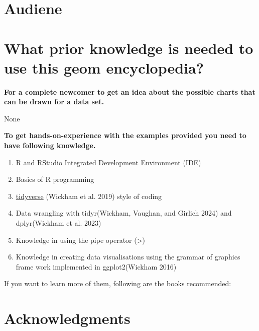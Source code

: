 \documentclass[
  letterpaper,
  DIV=11,
  numbers=noendperiod]{scrreprt}
\begin{document}

\section*{Audiene}\label{audiene}


\section*{\texorpdfstring{What prior knowledge is needed to use this
{geom
encyclopedia}?}{What prior knowledge is needed to use this geom encyclopedia?}}\label{what-prior-knowledge-is-needed-to-use-this-geom-encyclopedia}


\textbf{For a complete newcomer to get an idea about the possible charts
that can be drawn for a data set.}

None

\textbf{To get hands-on-experience with the examples provided you need
to have following knowledge.}

\begin{enumerate}
\def\labelenumi{\arabic{enumi}.}
\item
  R and RStudio Integrated Development Environment (IDE)
\item
  Basics of R programming
\item
  \href{https://www.tidyverse.org/}{tidyverse} (Wickham et al. 2019)
  style of coding
\item
  Data wrangling with tidyr(Wickham, Vaughan, and Girlich 2024) and
  dplyr(Wickham et al. 2023)
\item
  Knowledge in using the pipe operator (\textbar\textgreater)
\item
  Knowledge in creating data visualisations using the grammar of
  graphics frame work implemented in ggplot2(Wickham 2016)
\end{enumerate}

If you want to learn more of them, following are the books recommended:

\section*{Acknowledgments}\label{acknowledgments}
\end{document}
